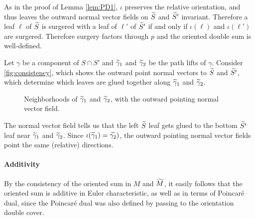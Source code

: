 As in the proof of Lemma \ref{lem:PD1}, $\iota$ preserves the relative orientation, and thus leaves the outward normal vector fields on $\widetilde{S}$ and $\widetilde{S}'$ invariant.
Therefore a leaf $\ell$ of $\widetilde{S}$ is surgered with a leaf of $\ell'$ of $\widetilde{S}'$ if and only if $\iota(\ell)$ and $\iota(\ell')$ are surgered.
Therefore surgery factors through $p$ and the oriented double sum is well-defined.

\begin{example}
  Let $\gamma$ be a component of $S\cap S'$ and $\widetilde{\gamma}_1$ and $\widetilde{\gamma}_2$ be the path lifts of $\gamma$.
  Consider \autoref{fig:consistency}, which shows the outward point normal vectors to $\widetilde{S}$ and $\widetilde{S'}$, which determine which leaves are glued together along $\widetilde{\gamma}_1$ and $\widetilde{\gamma}_2$.

\begin{figure}
  \centering
  \caption{Neighborhoods of $\widetilde{\gamma}_1$ and $\widetilde{\gamma}_2$, with the outward pointing normal vector field.}
  \label{fig:consistency}
\end{figure}

The normal vector field tells us that the left $\widetilde{S}$ leaf gets glued to the bottom $\widetilde{S'}$ leaf near $\widetilde{\gamma}_1$ and $\widetilde{\gamma}_2$.
Since $\iota(\widetilde{\gamma}_1)=\widetilde{\gamma_2})$, the outward pointing normal vector fields point the same (relative) directions.
\end{example}

\paragraph{Additivity}

By the consistency of the oriented sum in $M$ and $\widetilde{M}$, it easily follows that the oriented sum is additive in Euler characteristic, as well as in terms of Poincar\'e dual, since the Poincar\'e dual was also defined by passing to the orientation double cover.
